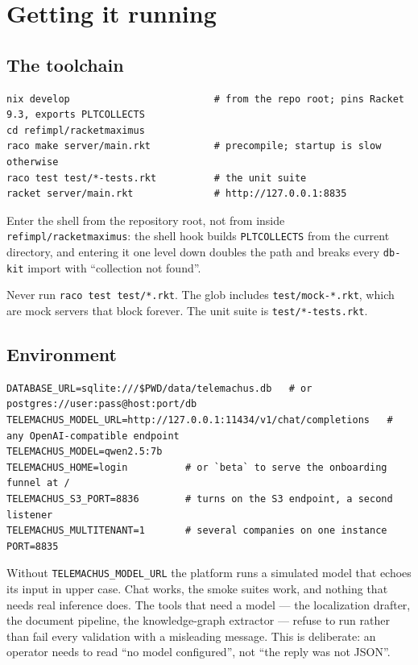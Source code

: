 \documentclass[11pt,a4paper]{report}
\gdef\currentchapterart{art/telemachus-head.png}
\newcommand{\chapterart}[1]{\gdef\currentchapterart{#1}}
\newcommand{\chapterart}[1]{}
\begin{document}
\chapterart{art/ch-02-running.png}
\chapter{Getting it running}

\section{The toolchain}

\begin{lstlisting}
nix develop                         # from the repo root; pins Racket 9.3, exports PLTCOLLECTS
cd refimpl/racketmaximus
raco make server/main.rkt           # precompile; startup is slow otherwise
raco test test/*-tests.rkt          # the unit suite
racket server/main.rkt              # http://127.0.0.1:8835
\end{lstlisting}

Enter the shell from the repository root, not from inside \texttt{refimpl/racketmaximus}: the shell hook builds \texttt{PLTCOLLECTS} from the current directory, and entering it one level down doubles the path and breaks every \texttt{db-kit} import with ``collection not found''.

Never run \texttt{raco test test/*.rkt}. The glob includes \texttt{test/mock-*.rkt}, which are mock servers that block forever. The unit suite is \texttt{test/*-tests.rkt}.

\section{Environment}

\begin{lstlisting}
DATABASE_URL=sqlite:///$PWD/data/telemachus.db   # or postgres://user:pass@host:port/db
TELEMACHUS_MODEL_URL=http://127.0.0.1:11434/v1/chat/completions   # any OpenAI-compatible endpoint
TELEMACHUS_MODEL=qwen2.5:7b
TELEMACHUS_HOME=login          # or `beta` to serve the onboarding funnel at /
TELEMACHUS_S3_PORT=8836        # turns on the S3 endpoint, a second listener
TELEMACHUS_MULTITENANT=1       # several companies on one instance
PORT=8835
\end{lstlisting}

Without \texttt{TELEMACHUS\_MODEL\_URL} the platform runs a simulated model that echoes its input in upper case. Chat works, the smoke suites work, and nothing that needs real inference does. The tools that need a model --- the localization drafter, the document pipeline, the knowledge-graph extractor --- refuse to run rather than fail every validation with a misleading message. This is deliberate: an operator needs to read ``no model configured'', not ``the reply was not JSON''.
\end{document}
